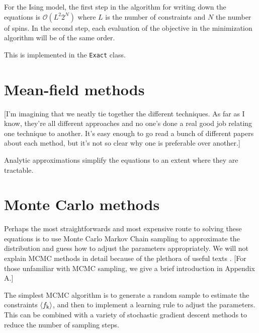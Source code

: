\documentclass[aps,prl,twocolumn]{revtex4-1}
\begin{document}
For the Ising model, the first step in the algorithm for writing down the equations is $\mathcal{O}(L^2 2^{N})$ where $L$ is the number of constraints and $N$ the number of spins. In the second step, each evaluation of the objective in the minimization algorithm will be of the same order.

This is implemented in the {\tt Exact} class.

\section{Mean-field methods}
[I'm imagining that we neatly tie together the different techniques. As far as I know, they're all different approaches and no one's done a real good job relating one technique to another. It's easy enough to go read a bunch of different papers about each method, but it's not so clear why one is preferable over another.]

Analytic approximations simplify the equations to an extent where they are tractable.


\section{Monte Carlo methods}
Perhaps the most straightforwards and most expensive route to solving these equations is to use Monte Carlo Markov Chain sampling to approximate the distribution and guess how to adjust the parameters appropriately. We will not explain MCMC methods in detail because of the plethora of useful texts \cite{MacKay:2005wc}. [For those unfamiliar with MCMC sampling, we give a brief introduction in Appendix A.]

The simplest MCMC algorithm is to generate a random sample to estimate the constraints $\left<f_{\rm k}\right>$, and then to implement a learning rule to adjust the parameters.
This can be combined with a variety of stochastic gradient descent methods to reduce the number of sampling steps.
\end{document}
